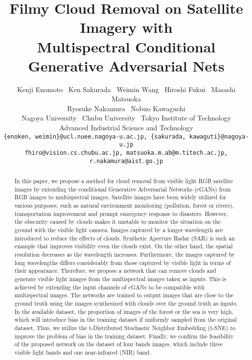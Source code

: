 \documentclass[10pt,twocolumn,letterpaper]{article}
\begin{document}
\title{Filmy Cloud Removal on Satellite Imagery with\\ Multispectral Conditional Generative Adversarial Nets}

\author{Kenji Enomoto \ Ken Sakurada \ Weimin Wang \ Hiroshi Fukui \ Masashi Matsuoka\\ Ryosuke Nakamura \ Nobuo Kawaguchi\\
Nagoya University \ Chubu University \ Tokyo Institute of Technology\\ Advanced Industrial Science and Technology\\
{\tt\small \{enoken, weimin\}@ucl.nuee.nagoya-u.ac.jp, \{sakurada, kawaguti\}@nagoya-u.jp}\\ {\tt\small fhiro@vision.cs.chubu.ac.jp, matsuoka.m.ab@m.titech.ac.jp, r.nakamura@aist.go.jp}
}




\maketitle


\begin{abstract}
In this paper, we propose a method for cloud removal from visible light RGB satellite images by extending the conditional Generative Adversarial Networks (cGANs) from RGB images to multispectral images. Satellite images have been widely utilized for various purposes, such as natural environment monitoring (pollution, forest or rivers), transportation improvement and prompt emergency response to disasters. However, the obscurity caused by clouds makes it unstable to monitor the situation on the ground with the visible light camera. Images captured by a longer wavelength are introduced to reduce the effects of clouds. Synthetic Aperture Radar (SAR) is such an example that improves visibility even the clouds exist. On the other hand, the spatial resolution decreases as the wavelength increases. Furthermore, the images captured by long wavelengths differs considerably from those captured by visible light in terms of their appearance. Therefore, we propose a network that can remove clouds and generate visible light images from the multispectral images taken as inputs. This is achieved by extending the input channels of cGANs to be compatible with multispectral images. The networks are trained to output images that are close to the ground truth using the images synthesized with clouds over the ground truth as inputs. In the available dataset, the proportion of images of the forest or the sea is very high, which will introduce bias in the training dataset if uniformly sampled from the original dataset. Thus, we utilize the t-Distributed Stochastic Neighbor Embedding (t-SNE) to improve the problem of bias in the training dataset. Finally, we confirm the feasibility of the proposed network on the dataset of four bands images, which include three visible light bands and one near-infrared (NIR) band.
\end{abstract}
\end{document}
